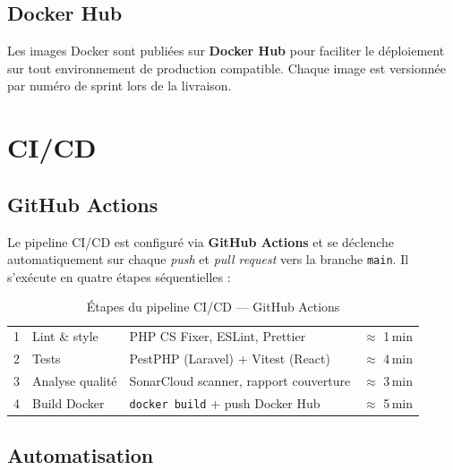 \subsection{Docker Hub}

Les images Docker sont publiées sur \textbf{Docker Hub} pour faciliter le déploiement
sur tout environnement de production compatible. Chaque image est versionnée par
numéro de sprint lors de la livraison.

\section{CI/CD}

\subsection{GitHub Actions}

Le pipeline CI/CD est configuré via \textbf{GitHub Actions} et se déclenche
automatiquement sur chaque \textit{push} et \textit{pull request} vers la branche
\texttt{main}. Il s'exécute en quatre étapes séquentielles :

\begin{table}[H]
  \centering
  \caption{Étapes du pipeline CI/CD — GitHub Actions}
  \label{tab:cicd_steps}
  \begin{tabularx}{\textwidth}{C{0.8cm}L{3.5cm}X L{2.5cm}}
    \toprule
    \thead{\#} &  &  &  \\
    \midrule
    1 & Lint \& style  & PHP CS Fixer, ESLint, Prettier           & $\approx$ 1\,min \\
    2 & Tests          & PestPHP (Laravel) + Vitest (React)       & $\approx$ 4\,min \\
    3 & Analyse qualité & SonarCloud scanner, rapport couverture  & $\approx$ 3\,min \\
    4 & Build Docker   & \texttt{docker build} + push Docker Hub  & $\approx$ 5\,min \\
    \bottomrule
  \end{tabularx}
\end{table}

\subsection{Automatisation}

